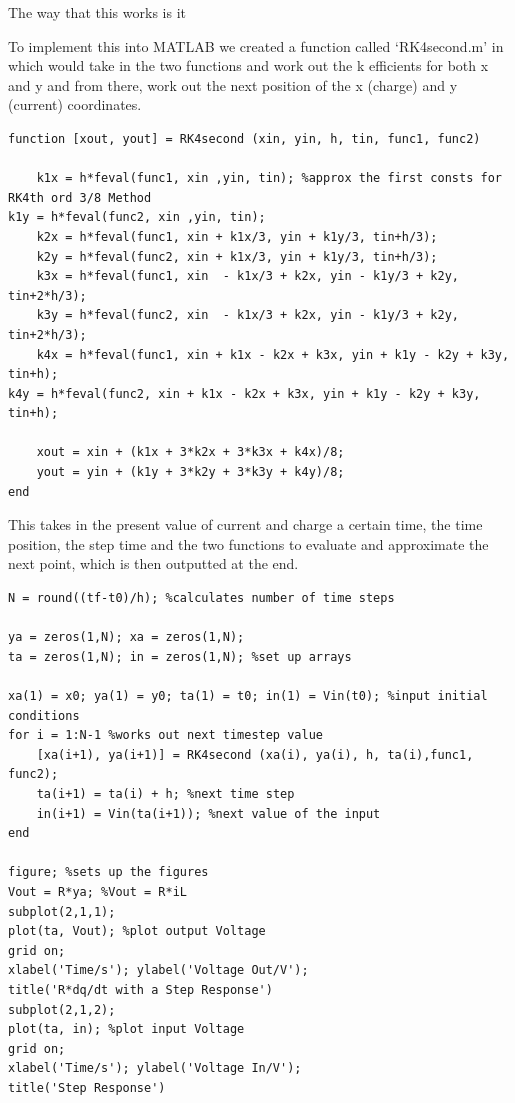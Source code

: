 \documentclass[10pt,a4paper]{article}
\begin{document}
The way that this works is it

To implement this into MATLAB we created a function called `RK4second.m' in which would take in the two functions and work out the k efficients for both x and y and from there, work out the next position of the x (charge) and y (current) coordinates.

\begin{verbatim}
function [xout, yout] = RK4second (xin, yin, h, tin, func1, func2)

	k1x = h*feval(func1, xin ,yin, tin); %approx the first consts for RK4th ord 3/8 Method
k1y = h*feval(func2, xin ,yin, tin);
	k2x = h*feval(func1, xin + k1x/3, yin + k1y/3, tin+h/3);
	k2y = h*feval(func2, xin + k1x/3, yin + k1y/3, tin+h/3);
	k3x = h*feval(func1, xin  - k1x/3 + k2x, yin - k1y/3 + k2y, tin+2*h/3);
	k3y = h*feval(func2, xin  - k1x/3 + k2x, yin - k1y/3 + k2y, tin+2*h/3);
	k4x = h*feval(func1, xin + k1x - k2x + k3x, yin + k1y - k2y + k3y, tin+h);
k4y = h*feval(func2, xin + k1x - k2x + k3x, yin + k1y - k2y + k3y, tin+h);

	xout = xin + (k1x + 3*k2x + 3*k3x + k4x)/8;
	yout = yin + (k1y + 3*k2y + 3*k3y + k4y)/8;
end
\end{verbatim}

This takes in the present value of current and charge a certain time, the time position, the step time and the two functions to evaluate and approximate the next point, which is then outputted at the end.

\begin{verbatim}
N = round((tf-t0)/h); %calculates number of time steps

ya = zeros(1,N); xa = zeros(1,N);
ta = zeros(1,N); in = zeros(1,N); %set up arrays

xa(1) = x0; ya(1) = y0; ta(1) = t0; in(1) = Vin(t0); %input initial conditions
for i = 1:N-1 %works out next timestep value
	[xa(i+1), ya(i+1)] = RK4second (xa(i), ya(i), h, ta(i),func1, func2);
    ta(i+1) = ta(i) + h; %next time step
    in(i+1) = Vin(ta(i+1)); %next value of the input
end

figure; %sets up the figures
Vout = R*ya; %Vout = R*iL
subplot(2,1,1);
plot(ta, Vout); %plot output Voltage
grid on;
xlabel('Time/s'); ylabel('Voltage Out/V');
title('R*dq/dt with a Step Response')
subplot(2,1,2);
plot(ta, in); %plot input Voltage
grid on;
xlabel('Time/s'); ylabel('Voltage In/V');
title('Step Response')
\end{verbatim}
\end{document}
